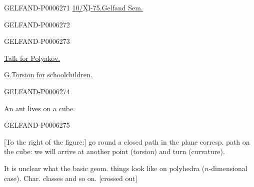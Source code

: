 \begin{GelfandAdjacentEvidence}{GELFAND-P000627}{1}
\underline{10/\(\overline{\underline{\mathrm{XI}}}\)-75.}\qquad\underline{Gelfand Sem.}
\end{GelfandAdjacentEvidence}
\begin{GelfandAdjacentEvidence}{GELFAND-P000627}{2}

\end{GelfandAdjacentEvidence}
\begin{GelfandAdjacentEvidence}{GELFAND-P000627}{3}

\underline{Talk for Polyakov.}

\underline{G.}\quad \underline{Torsion for schoolchildren.}
\end{GelfandAdjacentEvidence}
\begin{GelfandAdjacentEvidence}{GELFAND-P000627}{4}

An ant lives on a cube.
\end{GelfandAdjacentEvidence}
\begin{GelfandAdjacentEvidence}{GELFAND-P000627}{5}

[To the right of the figure:] go round a closed path in the plane
corresp. path on the cube: we will arrive at another point (torsion)
and turn (curvature).

It is unclear what the basic geom. things look like on polyhedra (\(n\)-dimensional case).
Char. classes and so on. [crossed out]
\end{GelfandAdjacentEvidence}

